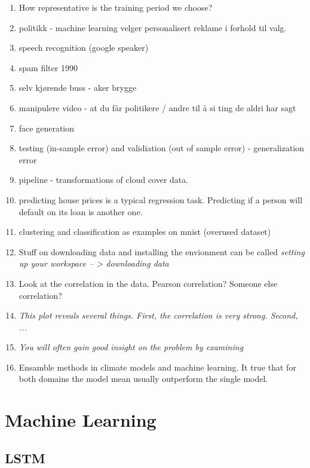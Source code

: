 \begin{enumerate}
    \item How representative is the training period we choose?
    \item politikk - machine learning velger personalisert reklame i forhold til valg.
    \item speech recognition (google speaker)
    \item spam filter 1990
    \item selv kjørende buss - aker brygge 
    \item manipulere video - at du får politikere / andre til å si ting de aldri har sagt
    \item face generation
    \item testing (in-sample error) and validiation (out of sample error) - generalization error 
    \item pipeline - transformations of cloud cover data. 
    \item predicting house prices is a typical regression task. Predicting if a person will default on its loan is another one. 
    \item clustering and classification as examples on mnist (overused dataset)
    \item Stuff on downloading data and installing the envionment can be called \textit{setting up your workspace -- > downloading data}
    \item Look at the correlation in the data. Pearson correlation? Someone else correlation?
    \item \textit{This plot reveals several things. First, the correlation is very strong. Second, ... }
    \item \textit{You will often gain good insight on the problem by examining }
    \item Ensamble methods in climate models and machine learning. It true that for both domains the model mean usually outperform the single model.
\end{enumerate}

\section{Machine Learning}


\subsection{LSTM}






